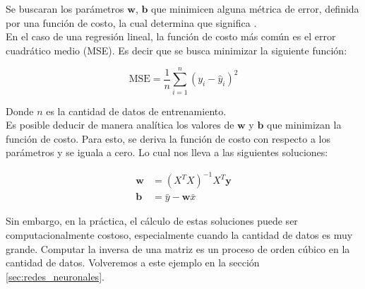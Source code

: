 Se buscaran los par\'ametros $\mathbf{w}$, $\mathbf{b}$ que minimicen alguna m\'etrica de error, definida por una funci\'on de costo, la cual determina que significa . \\

En el caso de una regresi\'on lineal, la funci\'on de costo m\'as com\'un es el error cuadr\'atico medio (MSE). Es decir que se busca minimizar la siguiente funci\'on:

\begin{equation}
    \text{MSE} = \frac{1}{n} \sum_{i=1}^{n} \left(y_i - \hat{y}_i\right)^2
\end{equation}

Donde $n$ es la cantidad de datos de entrenamiento.\\

Es posible deducir de manera anal\'itica los valores de $\mathbf{w}$ y $\mathbf{b}$ que minimizan la funci\'on de costo. Para esto, se deriva la funci\'on de costo con respecto a los par\'ametros y se iguala a cero. Lo cual nos lleva a las siguientes soluciones:

\begin{equation}
    \begin{split}
        \mathbf{w} &= \left(X^T X\right)^{-1} X^T \mathbf{y} \\
        \mathbf{b} &= \bar{y} - \mathbf{w} \bar{x}
    \end{split}
\end{equation}

Sin embargo, en la pr\'actica, el c\'alculo de estas soluciones puede ser computacionalmente costoso, especialmente cuando la cantidad de datos es muy grande. Computar la inversa de una matriz es un proceso de orden c\'ubico en la cantidad de datos. Volveremos a este ejemplo en la secci\'on \ref{sec:redes_neuronales}. \\
